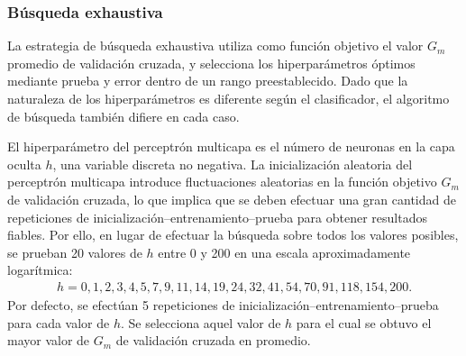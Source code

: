 %
\subsubsection{Búsqueda exhaustiva}
%
La estrategia de búsqueda exhaustiva utiliza como función objetivo el
valor $G_m$ promedio de validación cruzada, y selecciona los
hiperparámetros óptimos mediante prueba y error dentro de un rango
preestablecido. Dado que la naturaleza de los hiperparámetros es
diferente según el clasificador, el algoritmo de búsqueda también
difiere en cada caso.

El hiperparámetro del perceptrón multicapa es el número de neuronas en
la capa oculta $h$, una variable discreta no negativa. La
inicialización aleatoria del perceptrón multicapa introduce
fluctuaciones aleatorias en la función objetivo $G_m$ de validación
cruzada, lo que implica que se deben efectuar una gran cantidad de
repeticiones de inicialización--entrenamiento--prueba para obtener
resultados fiables.  Por ello, en lugar de efectuar la búsqueda sobre
todos los valores posibles, se prueban 20 valores de $h$ entre 0 y 200
en una escala aproximadamente logarítmica:
%
\begin{align}
  \label{mlp-hidden-tries}
  h=0,1,2,3,4,5,7,9,11,14,19,24,32,41,54,70,91,118,154,200.
\end{align}
%
Por defecto, se efectúan 5 repeticiones de
inicialización--entrenamiento--prueba para cada valor de $h$. Se
selecciona aquel valor de $h$ para el cual se obtuvo el mayor valor de
$G_m$ de validación cruzada en promedio.
